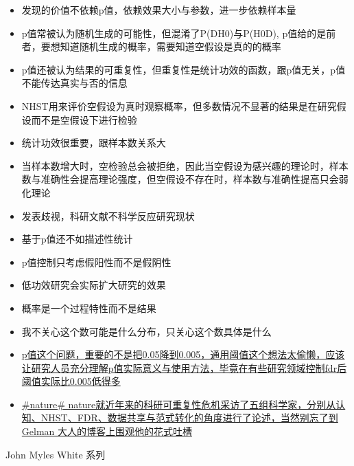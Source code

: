 \documentclass[]{tufte-book}
\providecommand{\tightlist}{%
  \setlength{\itemsep}{0pt}\setlength{\parskip}{0pt}}
\begin{document}
\begin{itemize}
\tightlist
\item
  发现的价值不依赖p值，依赖效果大小与参数，进一步依赖样本量
\item
  p值常被认为随机生成的可能性，但混淆了P(D\textbar{}H0)与P(H0\textbar{}D), p值给的是前者，要想知道随机生成的概率，需要知道空假设是真的的概率
\item
  p值还被认为结果的可重复性，但重复性是统计功效的函数，跟p值无关，p值不能传达真实与否的信息
\item
  NHST用来评价空假设为真时观察概率，但多数情况不显著的结果是在研究假设而不是空假设下进行检验
\item
  统计功效很重要，跟样本数关系大
\item
  当样本数增大时，空检验总会被拒绝，因此当空假设为感兴趣的理论时，样本数与准确性会提高理论强度，但空假设不存在时，样本数与准确性提高只会弱化理论
\item
  发表歧视，科研文献不科学反应研究现状
\item
  基于p值还不如描述性统计
\item
  p值控制只考虑假阳性而不是假阴性
\item
  低功效研究会实际扩大研究的效果
\item
  概率是一个过程特性而不是结果
\item
  我不关心这个数可能是什么分布，只关心这个数具体是什么
\item
  \href{http://www.nature.com/news/one-size-fits-all-threshold-for-p-values-under-fire-1.22625}{p值这个问题，重要的不是把0.05降到0.005，通用阈值这个想法太偷懒，应该让研究人员充分理解p值实际意义与使用方法，毕竟在有些研究领域控制fdr后阈值实际比0.005低得多}
\item
  \href{https://www.nature.com/articles/d41586-017-07522-z}{\#nature\# nature就近年来的科研可重复性危机采访了五组科学家，分别从认知、NHST、FDR、数据共享与范式转化的角度进行了论述，当然别忘了到 Gelman 大人的博客上围观他的花式吐槽}
\end{itemize}

John Myles White 系列
\end{document}
